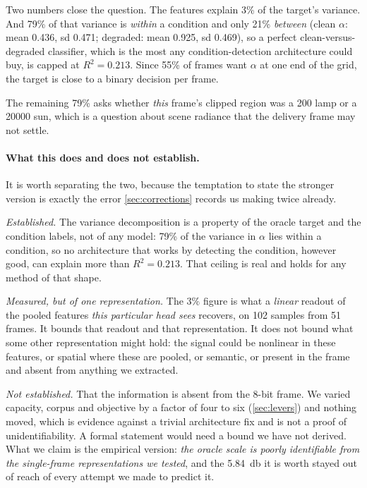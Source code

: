 Two numbers close the question. The features explain 3\% of the target's
variance. And 79\% of that variance is \emph{within} a condition and only 21\%
\emph{between} (clean $\alpha$: mean \num{0.436}, sd \num{0.471}; degraded: mean
\num{0.925}, sd \num{0.469}), so a perfect clean-versus-degraded classifier,
which is the most any condition-detection architecture could buy, is capped at
$R^2 = \num{0.213}$. Since 55\% of frames want $\alpha$ at one end of the grid,
the target is close to a binary decision per frame.

The remaining 79\% asks whether \emph{this} frame's clipped region was a
\SI{200}{\nits} lamp or a \SI{20000}{\nits} sun, which is a question about
scene radiance that the delivery frame may not settle.

\paragraph{What this does and does not establish.} It is worth separating the
two, because the temptation to state the stronger version is exactly the error
\cref{sec:corrections} records us making twice already.

\emph{Established.} The variance decomposition is a property of the oracle
target and the condition labels, not of any model: 79\% of the variance in
$\alpha$ lies within a condition, so no architecture that works by detecting the
condition, however good, can explain more than $R^2 = \num{0.213}$. That ceiling
is real and holds for any method of that shape.

\emph{Measured, but of one representation.} The $3\%$ figure is what a
\emph{linear} readout of the pooled features \emph{this particular head sees}
recovers, on 102 samples from 51 frames. It bounds that readout and that
representation. It does not bound what some other representation might hold: the
signal could be nonlinear in these features, or spatial where these are pooled,
or semantic, or present in the frame and absent from anything we extracted.

\emph{Not established.} That the information is absent from the 8-bit frame. We
varied capacity, corpus and objective by a factor of four to six
(\cref{sec:levers}) and nothing moved, which is evidence against a trivial
architecture fix and is not a proof of unidentifiability. A formal statement
would need a bound we have not derived. What we claim is the empirical version:
\emph{the oracle scale is poorly identifiable from the single-frame
representations we tested}, and the \SI{5.84}{\decibel} it is worth stayed out
of reach of every attempt we made to predict it.

